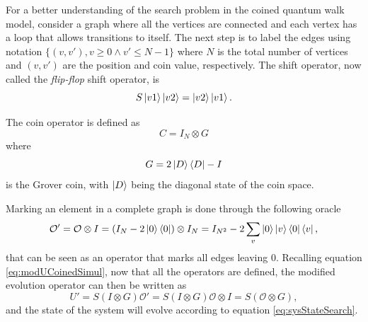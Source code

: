 \documentclass[../../dissertation.tex]{subfiles}
\begin{document}
For a better understanding of the search problem in the coined quantum walk
model, consider a graph where all the vertices are connected and each vertex
has a loop that allows transitions to itself.  The next step is to label the
edges using notation $\{(v,v'), v \geqslant 0 \land v' \leqslant N-1\}$ where
$N$ is the total number of vertices and $(v,v')$ are the position and coin
value, respectively.  The shift operator, now called the \textit{flip-flop} shift
operator, is
\begin{equation}
	S\ket{v1}\ket{v2} = \ket{v2}\ket{v1}.
	\label{eq:chap3FlipFlop}
\end{equation}\par
The coin operator is defined as
\begin{equation}
	C = I_N \otimes G
\end{equation}
where 
\begin{equation}
	G = 2\ket{D}\bra{D} - I
\end{equation}
is the Grover coin, with $\ket{D}$ being the diagonal state of the coin space.\par

Marking an element in a complete graph is done through the following oracle
\begin{equation}
	\mathcal{O'} =\mathcal{O}\otimes I = (I_N - 2\ket{0}\bra{0})\otimes I_N = I_{N^2} - 2 \sum_v \ket{0}\ket{v}\bra{0}\bra{v} ,
\end{equation}
that can be seen as an operator that marks all edges leaving $0$. Recalling equation
\eqref{eq:modUCoinedSimul}, now that all the operators are defined, the modified evolution
operator can then be written as
\begin{equation}
	U' = S(I \otimes G)\mathcal{O'} = S(I \otimes G)\mathcal{O} \otimes I = S (\mathcal{O} \otimes G),\label{eq:modifiedEvoCoined}
\end{equation}
and the state of the system will evolve according to equation \eqref{eq:sysStateSearch}.\par 
\end{document}
